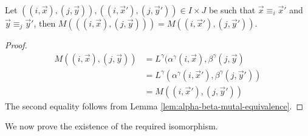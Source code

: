 \documentclass[../paper.tex]{subfiles}
\begin{document}

\begin{lem}
  Let $((i, \vec{x}), (j, \vec{y})), ((i, \vec{x}'), (j, \vec{y}')) \in I \times
  J$ be such that $\vec{x} \equiv_i \vec{x}'$ and $\vec{y} \equiv_j \vec{y}'$,
  then $M(((i, \vec{x}), (j, \vec{y}))) = M((i, \vec{x}'), (j, \vec{y}'))$.
  \label{lem:matrix-quot-well-defined}
\end{lem}
\begin{proof}
  \begin{align*}
    M((i, \vec{x}),(j, \vec{y})) &= L^{\gamma}(\alpha^{\gamma}(i, \vec{x}), \beta^{\gamma}(j, \vec{y}) \\
                                 &= L^{\gamma}(\alpha^{\gamma}(i, \vec{x}'), \beta^{\gamma}(j, \vec{y}'))\\
                                 &= M((i, \vec{x}'), (j, \vec{y}'))
  \end{align*}
  The second equality follows from Lemma \ref{lem:alpha-beta-mutal-equivalence}.
\end{proof}

We now prove the existence of the required isomorphism.
\end{document}
